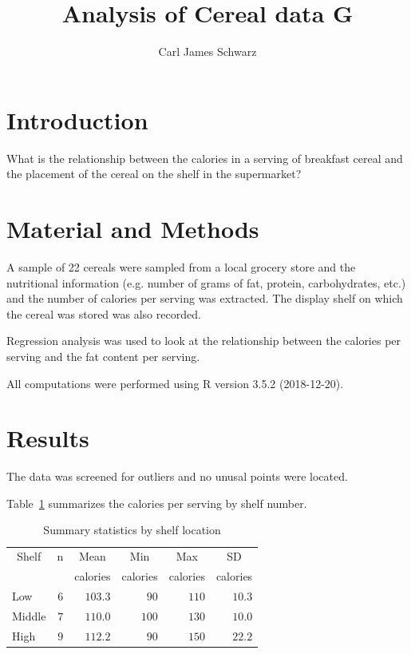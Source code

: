 \documentclass{article}\usepackage[]{graphicx}\usepackage[]{color}
\title{Analysis of Cereal data G}
\author{Carl James Schwarz}
\begin{document}
\maketitle




\section{Introduction}
What is the relationship between the calories in a serving of breakfast
cereal and the placement of the cereal on the shelf in the supermarket?


\section{Material and Methods}
A sample of 22 cereals were sampled from a local grocery store
and the nutritional information (e.g. number of grams of fat, protein, carbohydrates, etc.)
and the number of calories per serving was extracted. 
The display shelf on which the cereal was stored was also recorded.

Regression analysis was used to look at the relationship between
the calories per serving and the fat content per serving.

All computations were performed using R version 3.5.2 (2018-12-20).


\section{Results}
The data was screened for outliers and no unusal points were located.

Table~\ref{tab:table1} summarizes the calories per serving by shelf number.
\begin{table}[b]
\caption{Summary statistics by shelf location\label{tab:table1}} 
\begin{center}
\begin{tabular}{lrrrrr}
\hline\hline
\multicolumn{1}{c}{Shelf}&\multicolumn{1}{c}{n}&\multicolumn{1}{c}{Mean}&\multicolumn{1}{c}{Min}&\multicolumn{1}{c}{Max}&\multicolumn{1}{c}{SD}\tabularnewline
&&\multicolumn{1}{c}{{\scriptsize calories}}&\multicolumn{1}{c}{{\scriptsize calories}}&\multicolumn{1}{c}{{\scriptsize calories}}&\multicolumn{1}{c}{{\scriptsize calories}}\tabularnewline
\hline
Low&$6$&$103.3$&$ 90$&$110$&$10.3$\tabularnewline
Middle&$7$&$110.0$&$100$&$130$&$10.0$\tabularnewline
High&$9$&$112.2$&$ 90$&$150$&$22.2$\tabularnewline
\hline
\end{tabular}\end{center}
\end{table}
\end{document}
